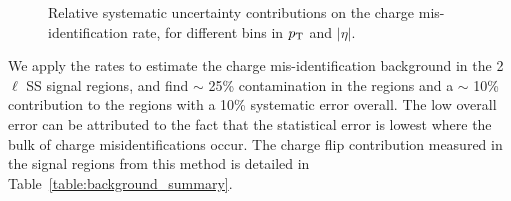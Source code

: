  \begin{figure}[htp!] 
\centering
\setlength{\fboxrule}{0 pt}
% 

% 
\caption{Relative systematic uncertainty contributions on the
      charge mis-identification rate, for different bins in $p_{\rm T}$ and 
      $|\eta|$.}\label{figure:background_qmissyst}
 \end{figure}

We apply the rates to estimate the charge mis-identification background in the 2$\ell$ SS signal regions, and find  $\sim$ 25\% contamination in the \ee regions and a $\sim$ 10\% contribution to the \emu regions with a 10\% systematic error overall. The low overall error can be attributed to the fact that the statistical error is lowest where the bulk of charge misidentifications occur. The charge flip contribution measured in the signal regions from this method is detailed in Table~\ref{table:background_summary}. 


